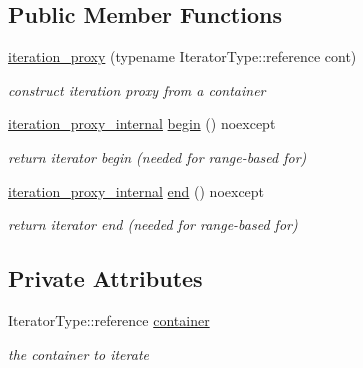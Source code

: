 \subsection*{Public Member Functions}
\begin{DoxyCompactItemize}
\item 
\hypertarget{classnlohmann_1_1basic__json_1_1iteration__proxy_a25bf4984cce730759082b6f5c483e0dc}{}\label{classnlohmann_1_1basic__json_1_1iteration__proxy_a25bf4984cce730759082b6f5c483e0dc} 
\hyperlink{classnlohmann_1_1basic__json_1_1iteration__proxy_a25bf4984cce730759082b6f5c483e0dc}{iteration\+\_\+proxy} (typename Iterator\+Type\+::reference cont)
\begin{DoxyCompactList}\small\item\em construct iteration proxy from a container \end{DoxyCompactList}\item 
\hypertarget{classnlohmann_1_1basic__json_1_1iteration__proxy_af4d6eb84a5e74c15fd1d47091429b50e}{}\label{classnlohmann_1_1basic__json_1_1iteration__proxy_af4d6eb84a5e74c15fd1d47091429b50e} 
\hyperlink{classnlohmann_1_1basic__json_1_1iteration__proxy_1_1iteration__proxy__internal}{iteration\+\_\+proxy\+\_\+internal} \hyperlink{classnlohmann_1_1basic__json_1_1iteration__proxy_af4d6eb84a5e74c15fd1d47091429b50e}{begin} () noexcept
\begin{DoxyCompactList}\small\item\em return iterator begin (needed for range-\/based for) \end{DoxyCompactList}\item 
\hypertarget{classnlohmann_1_1basic__json_1_1iteration__proxy_afc4cfc693059a127c288fa6175d44cf0}{}\label{classnlohmann_1_1basic__json_1_1iteration__proxy_afc4cfc693059a127c288fa6175d44cf0} 
\hyperlink{classnlohmann_1_1basic__json_1_1iteration__proxy_1_1iteration__proxy__internal}{iteration\+\_\+proxy\+\_\+internal} \hyperlink{classnlohmann_1_1basic__json_1_1iteration__proxy_afc4cfc693059a127c288fa6175d44cf0}{end} () noexcept
\begin{DoxyCompactList}\small\item\em return iterator end (needed for range-\/based for) \end{DoxyCompactList}\end{DoxyCompactItemize}
\subsection*{Private Attributes}
\begin{DoxyCompactItemize}
\item 
\hypertarget{classnlohmann_1_1basic__json_1_1iteration__proxy_a07048776258c709360bc0e46e261ee64}{}\label{classnlohmann_1_1basic__json_1_1iteration__proxy_a07048776258c709360bc0e46e261ee64} 
Iterator\+Type\+::reference \hyperlink{classnlohmann_1_1basic__json_1_1iteration__proxy_a07048776258c709360bc0e46e261ee64}{container}
\begin{DoxyCompactList}\small\item\em the container to iterate \end{DoxyCompactList}\end{DoxyCompactItemize}


